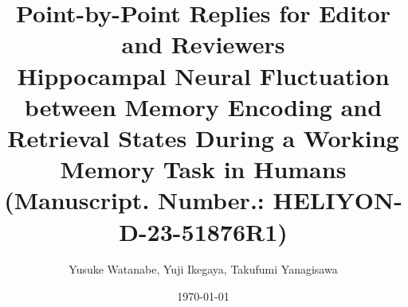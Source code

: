 
\title{
  \fontsize{14pt}{18pt}\selectfont
  Point-by-Point Replies for Editor and Reviewers\\
  Hippocampal Neural Fluctuation between Memory Encoding and Retrieval States During a Working Memory Task in Humans \\
  (Manuscript. Number.: HELIYON-D-23-51876R1)
}
\author{Yusuke Watanabe, Yuji Ikegaya, Takufumi Yanagisawa}
\date{\today}
\maketitle
